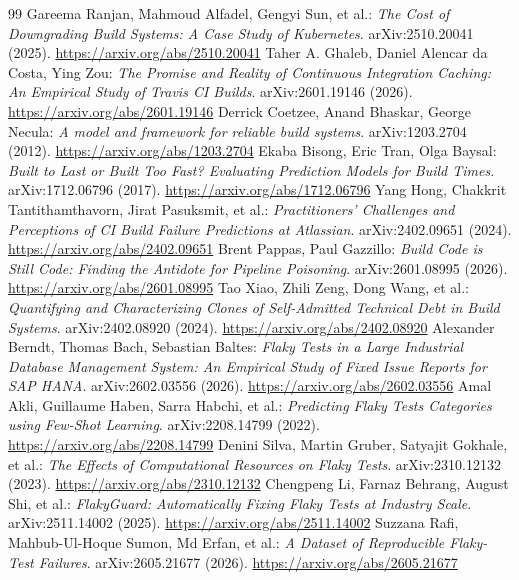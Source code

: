 \documentclass[11pt,a4paper]{article}
\begin{document}
\begin{thebibliography}{99}
 Gareema Ranjan, Mahmoud Alfadel, Gengyi Sun, et al.: \emph{The Cost of Downgrading Build Systems: A Case Study of Kubernetes}. arXiv:2510.20041 (2025). \url{https://arxiv.org/abs/2510.20041}
 Taher A. Ghaleb, Daniel Alencar da Costa, Ying Zou: \emph{The Promise and Reality of Continuous Integration Caching: An Empirical Study of Travis CI Builds}. arXiv:2601.19146 (2026). \url{https://arxiv.org/abs/2601.19146}
 Derrick Coetzee, Anand Bhaskar, George Necula: \emph{A model and framework for reliable build systems}. arXiv:1203.2704 (2012). \url{https://arxiv.org/abs/1203.2704}
 Ekaba Bisong, Eric Tran, Olga Baysal: \emph{Built to Last or Built Too Fast? Evaluating Prediction Models for Build Times}. arXiv:1712.06796 (2017). \url{https://arxiv.org/abs/1712.06796}
 Yang Hong, Chakkrit Tantithamthavorn, Jirat Pasuksmit, et al.: \emph{Practitioners' Challenges and Perceptions of CI Build Failure Predictions at Atlassian}. arXiv:2402.09651 (2024). \url{https://arxiv.org/abs/2402.09651}
 Brent Pappas, Paul Gazzillo: \emph{Build Code is Still Code: Finding the Antidote for Pipeline Poisoning}. arXiv:2601.08995 (2026). \url{https://arxiv.org/abs/2601.08995}
 Tao Xiao, Zhili Zeng, Dong Wang, et al.: \emph{Quantifying and Characterizing Clones of Self-Admitted Technical Debt in Build Systems}. arXiv:2402.08920 (2024). \url{https://arxiv.org/abs/2402.08920}
 Alexander Berndt, Thomas Bach, Sebastian Baltes: \emph{Flaky Tests in a Large Industrial Database Management System: An Empirical Study of Fixed Issue Reports for SAP HANA}. arXiv:2602.03556 (2026). \url{https://arxiv.org/abs/2602.03556}
 Amal Akli, Guillaume Haben, Sarra Habchi, et al.: \emph{Predicting Flaky Tests Categories using Few-Shot Learning}. arXiv:2208.14799 (2022). \url{https://arxiv.org/abs/2208.14799}
 Denini Silva, Martin Gruber, Satyajit Gokhale, et al.: \emph{The Effects of Computational Resources on Flaky Tests}. arXiv:2310.12132 (2023). \url{https://arxiv.org/abs/2310.12132}
 Chengpeng Li, Farnaz Behrang, August Shi, et al.: \emph{FlakyGuard: Automatically Fixing Flaky Tests at Industry Scale}. arXiv:2511.14002 (2025). \url{https://arxiv.org/abs/2511.14002}
 Suzzana Rafi, Mahbub-Ul-Hoque Sumon, Md Erfan, et al.: \emph{A Dataset of Reproducible Flaky-Test Failures}. arXiv:2605.21677 (2026). \url{https://arxiv.org/abs/2605.21677}

\end{thebibliography}
\end{document}
